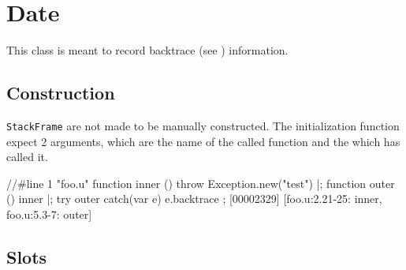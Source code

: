 
\section{Date}

This class is meant to record backtrace (see )
information.
\experimental{}


\subsection{Construction}

\lstinline|StackFrame| are not made to be manually constructed.  The
initialization function expect 2 arguments, which are the name of the
called function and the  which has called it.

\begin{urbiscript}[firstline=1]
//#line 1 "foo.u"
function inner () { throw Exception.new("test") }|;
function outer () { inner }|;
try
{
  outer
}
catch(var e)
{
  e.backtrace
};
[00002329] [foo.u:2.21-25: inner, foo.u:5.3-7: outer]
\end{urbiscript}

\subsection{Slots}

